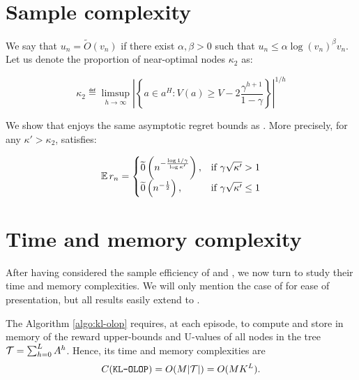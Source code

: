 \documentclass[runningheads, envcountsame, a4paper]{llncs}
\begin{document}
\section{Sample complexity}
\label{sec:sample-complexity}

We say that $u_n = \tilde{O}(v_n)$ if there exist $\alpha, \beta >0$ such that $u_n \leq \alpha \log(v_n)^\beta v_n$.
Let us denote the proportion of near-optimal nodes $\kappa_2$ as:


\begin{equation*}
    \label{eq:kappa}
    \kappa_2 \eqdef \limsup_{h\rightarrow\infty}{\left|\left\{a\in a^H:V(a) \geq V - 2\frac{\gamma^{h+1}}{1-\gamma}\right\}\right|^{1/h}}
\end{equation*}

\begin{theorem}
\label{thm:regret}
We show that \KLOLOP enjoys the same asymptotic regret bounds as \OLOP. More precisely, for any $\kappa' > \kappa_2$, \KLOLOP satisfies:


\begin{equation*}
    \expectedvalue r_n = \begin{cases}
      \tilde{0}\left(n^{-\frac{\log 1/\gamma}{\log \kappa'}}\right), & \text{if}\ \gamma\sqrt{\kappa'} > 1 \\
      \tilde{0}\left(n^{-\frac{1}{2}}\right), & \text{if}\ \gamma\sqrt{\kappa'} \leq 1
    \end{cases}
\end{equation*}
\end{theorem}

\section{Time and memory complexity}
\label{sec:time-complexity}

After having considered the sample efficiency of \OLOP and \KLOLOP, we now turn to study their time and memory complexities. We will only mention the case of \KLOLOP for ease of presentation, but all results easily extend to \OLOP.

The Algorithm \ref{algo:kl-olop} requires, at each episode, to compute and store in memory of the reward upper-bounds and U-values of all nodes in the tree $\mathcal{T} = \sum_{h=0}^L A^h$.
Hence, its time and memory complexities are 
\begin{equation}
    C(\texttt{KL-OLOP}) = O(M|\mathcal{T}|) = O(MK^L).
\end{equation}
\end{document}
